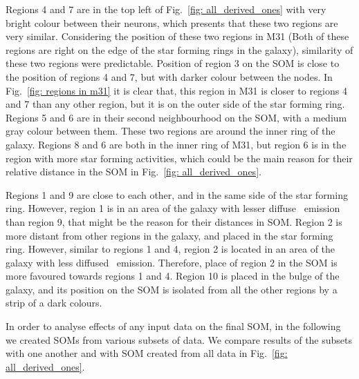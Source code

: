     Regions 4 and 7 are in the top left of Fig.~\ref{fig: all_derived_ones} with very bright colour between their neurons, which presents that these two regions are very similar.
    Considering the position of these two regions in M31 (Both of these regions are right on the edge of the star forming rings in the galaxy), similarity of these two regions were predictable.
    Position of region 3 on the SOM is close to the position of regions 4 and 7, but with darker colour between the nodes. 
    In Fig.~\ref{fig: regions in m31} it is clear that, this region in M31 is closer to regions 4 and 7 than any other region, but it is on the outer side of the star forming ring.
    Regions 5 and 6 are in their second neighbourhood on the SOM, with a medium gray colour between them.
    These two regions are around the inner ring of the galaxy.
    Regions 8 and 6 are both in the inner ring of M31, but region 6 is in the region with more star forming activities, which could be the main reason for their relative distance in the SOM in Fig.~\ref{fig: all_derived_ones}. 
    
    Regions 1 and 9 are close to each other, and in the same side of the star forming ring. 
    However, region 1 is in an area of the galaxy with lesser diffuse \halpha~emission than region 9, that might be the reason for their distances in SOM.
    Region 2 is more distant from other regions in the galaxy, and placed in the star forming ring.
    However, similar to regions 1 and 4, region 2 is located in an area of the galaxy with less diffused \halpha~emission.
    Therefore, place of region 2 in the SOM is more favoured towards regions 1 and 4. 
    Region 10 is placed in the bulge of the galaxy, and its position on the SOM is isolated from all the other regions by a strip of a dark colours. 
    
    In order to analyse effects of any input data on the final SOM, in the following we created SOMs from various subsets of data.
    We compare results of the subsets with one another and with SOM created from all data in Fig.~\ref{fig: all_derived_ones}.

